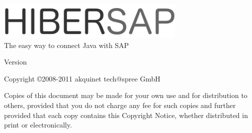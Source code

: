 \begin{titlepage}
	 \HRule 
	\begin{flushleft} 
	    \includegraphics[width=90mm]{HibersapLogo.png} \\
		\LARGE The easy way to connect Java with SAP \\
	\end{flushleft}
	\HRule {} 
	\begin{center} 
		\large Version \HibersapVersion 
	\end{center}
	\begin{center}
		\large Copyright \copyright 2008-2011 akquinet tech@spree GmbH
	\end{center}
	\begin{center} 
		Copies of this document may be made for your own use and for distribution to others, 
		provided that you do not charge any fee for such copies and further provided that each 
		copy contains this Copyright Notice, whether distributed in print or
		electronically.
	\end{center}
\end{titlepage}

